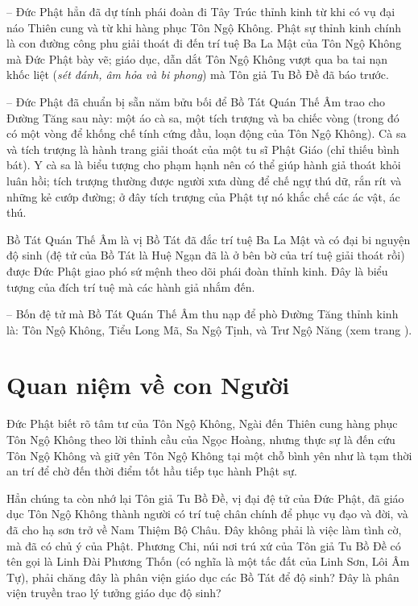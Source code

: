 -- Đức Phật hẳn đã dự tính phái đoàn đi Tây Trúc thỉnh kinh từ khi có vụ đại náo Thiên cung và từ khi hàng phục Tôn Ngộ Không. Phật sự thỉnh kinh chính là con đường công phu giải thoát đi đến trí tuệ Ba La Mật của Tôn Ngộ Không mà Đức Phật bày vẽ; giáo dục, dẫn dắt Tôn Ngộ Không vượt qua ba tai nạn khốc liệt (\emph{sét đánh, âm hỏa và bi phong}) mà Tôn giả Tu Bồ Đề đã báo trước.

-- Đức Phật đã chuẩn bị sẵn năm bửu bối để Bồ Tát Quán Thế Âm trao cho Đường Tăng sau này: một áo cà sa, một tích trượng và ba chiếc vòng (trong đó có một vòng để khống chế tính cứng đầu, loạn động của Tôn Ngộ Không). Cà sa và tích trượng là hành trang giải thoát của một tu sĩ Phật Giáo (chỉ thiếu bình bát). Y cà sa là biểu tượng cho phạm hạnh nên có thể giúp hành giả thoát khỏi luân hồi; tích trượng thường được người xưa dùng để chế ngự thú dữ, rắn rít và những kẻ cướp đường; ở đây tích trượng của Phật tự nó khắc chế các ác vật, ác thú.

Bồ Tát Quán Thế Âm là vị Bồ Tát đã đắc trí tuệ Ba La Mật và có đại bi nguyện độ sinh (đệ tử của Bồ Tát là Huệ Ngạn đã là ở bên bờ của trí tuệ giải thoát rồi) được Đức Phật giao phó sứ mệnh theo dõi phái đoàn thỉnh kinh. Đây là biểu tượng của đích trí tuệ mà các hành giả nhắm đến.

-- Bốn đệ tử mà Bồ Tát Quán Thế Âm thu nạp để phò Đường Tăng thỉnh kinh là: Tôn Ngộ Không, Tiểu Long Mã, Sa Ngộ Tịnh, và Trư Ngộ Năng (xem  trang \pageref{sec:qua_cac_nhan_vat_chinh}).

\section{Quan niệm về con Người} %
\label{sec:8_con_nguoi}

Đức Phật biết rõ tâm tư của Tôn Ngộ Không, Ngài đến Thiên cung hàng phục Tôn Ngộ Không theo lời thỉnh cầu của Ngọc Hoàng, nhưng thực sự là đến cứu Tôn Ngộ Không và giữ yên Tôn Ngộ Không tại một chỗ bình yên như là tạm thời an trí để chờ đến thời điểm tốt hầu tiếp tục hành Phật sự.

Hẳn chúng ta còn nhớ lại Tôn giả Tu Bồ Đề, vị đại đệ tử của Đức Phật, đã giáo dục Tôn Ngộ Không thành người có trí tuệ chân chính để phục vụ đạo và đời, và đã cho hạ sơn trở về Nam Thiệm Bộ Châu. Đây không phải là việc làm tình cờ, mà đã có chủ ý của Phật. Phương Chi, núi nơi trú xứ của Tôn giả Tu Bồ Đề có tên gọi là Linh Đài Phương Thốn (có nghĩa là một tấc đất của Linh Sơn, Lôi Âm Tự), phải chăng đây là phân viện giáo dục các Bồ Tát để độ sinh? Đây là phân viện truyền trao lý tưởng giáo dục độ sinh?

